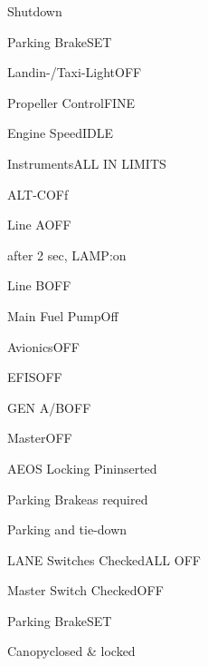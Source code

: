 \begin{checklist}{Shutdown}
  \item{Parking Brake}{SET}
  \item{Landin-/Taxi-Light}{OFF}
  \item{Propeller Control}{FINE}
  \item{Engine Speed}{IDLE}
  \item{Instruments}{ALL IN LIMITS}
  \item{ALT-C}{OFf}
  \item{Line A}{OFF}
  \item{after 2 sec, LAMP:}{on}
  \item{Line B}{OFF}
  \item{Main Fuel Pump}{Off}
  \item{Avionics}{OFF}
  \item{EFIS}{OFF}
  \item{GEN A/B}{OFF}
  \item{Master}{OFF}
  \item{AEOS Locking Pin}{inserted}
  \item{Parking Brake}{as required}
\end{checklist}

\begin{checklist}{Parking and tie-down}
  \item{LANE Switches Checked}{ALL OFF}
  \item{Master Switch Checked}{OFF}
  \item{Parking Brake}{SET}
  \item{Canopy}{closed \& locked}
\end{checklist}


